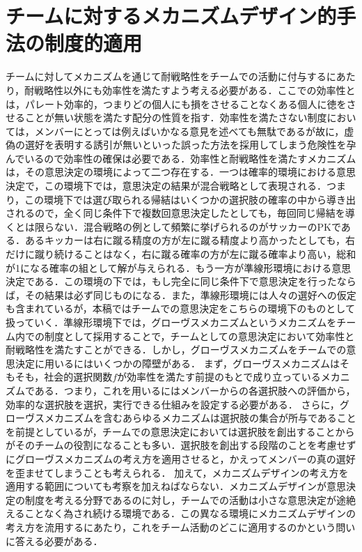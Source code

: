 \documentclass[a4paper, 11pt]{jsarticle}
\begin{document}
\section{チームに対するメカニズムデザイン的手法の制度的適用}
チームに対してメカニズムを通じて耐戦略性をチームでの活動に付与するにあたり，耐戦略性以外にも効率性を満たすよう考える必要がある．ここでの効率性とは，パレート効率的，つまりどの個人にも損をさせることなくある個人に徳をさせることが無い状態を満たす配分の性質を指す．効率性を満たさない制度においては，メンバーにとっては例えばいかなる意見を述べても無駄であるが故に，虚偽の選好を表明する誘引が無いといった誤った方法を採用してしまう危険性を孕んでいるので効率性の確保は必要である．効率性と耐戦略性を満たすメカニズムは，その意思決定の環境によって二つ存在する．一つは確率的環境における意思決定で，この環境下では，意思決定の結果が混合戦略として表現される．つまり，この環境下では選び取られる帰結はいくつかの選択肢の確率の中から導き出されるので，全く同じ条件下で複数回意思決定したとしても，毎回同じ帰結を導くとは限らない．混合戦略の例として頻繁に挙げられるのがサッカーのPKである．あるキッカーは右に蹴る精度の方が左に蹴る精度より高かったとしても，右だけに蹴り続けることはなく，右に蹴る確率の方が左に蹴る確率より高い，総和が1になる確率の組として解が与えられる．もう一方が準線形環境における意思決定である．この環境の下では，もし完全に同じ条件下で意思決定を行ったならば，その結果は必ず同じものになる．また，準線形環境には人々の選好への仮定も含まれているが，本稿ではチームでの意思決定をこちらの環境下のものとして扱っていく．準線形環境下では，グローヴスメカニズムというメカニズムをチーム内での制度として採用することで，チームとしての意思決定において効率性と耐戦略性を満たすことができる．しかし，グローヴスメカニズムをチームでの意思決定に用いるにはいくつかの障壁がある．
まず，グローヴスメカニズムはそもそも，社会的選択関数\(f\)が効率性を満たす前提のもとで成り立っているメカニズムである．つまり，これを用いるにはメンバーからの各選択肢への評価から，効率的な選択肢を選択，実行できる仕組みを設定する必要がある．
さらに，グローヴスメカニズムを含むあらゆるメカニズムは選択肢の集合が所与であることを前提としているが，チームでの意思決定においては選択肢を創出することからがそのチームの役割になることも多い．選択肢を創出する段階のことを考慮せずにグローヴスメカニズムの考え方を適用させると，かえってメンバーの真の選好を歪ませてしまうことも考えられる．
加えて，メカニズムデザインの考え方を適用する範囲についても考察を加えねばならない．メカニズムデザインが意思決定の制度を考える分野であるのに対し，チームでの活動は小さな意思決定が途絶えることなく為され続ける環境である．この異なる環境にメカニズムデザインの考え方を流用するにあたり，これをチーム活動のどこに適用するのかという問いに答える必要がある．
\end{document}
